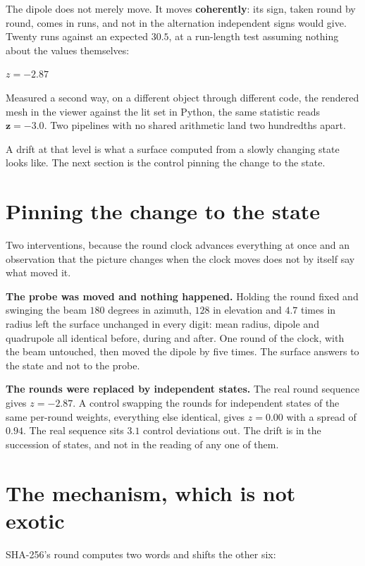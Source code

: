 The dipole does not merely move. It moves \textbf{coherently}: its sign, taken round by round, comes in runs, and not in the alternation independent signs would give. Twenty runs against an expected \(30.5\), at a run-length test assuming nothing about the values themselves:

\begin{center}
\(z = -2.87\)
\end{center}

Measured a second way, on a different object through different code, the rendered mesh in the viewer against the lit set in Python, the same statistic reads \(\mathbf{z = -3.0}\). Two pipelines with no shared arithmetic land two hundredths apart.

A drift at that level is what a surface computed from a slowly changing state looks like. The next section is the control pinning the change to the state.

\section{Pinning the change to the state}

Two interventions, because the round clock advances everything at once and an observation that the picture changes when the clock moves does not by itself say what moved it.

\textbf{The probe was moved and nothing happened.} Holding the round fixed and swinging the beam \(180\) degrees in azimuth, \(128\) in elevation and \(4.7\) times in radius left the surface unchanged in every digit: mean radius, dipole and quadrupole all identical before, during and after. One round of the clock, with the beam untouched, then moved the dipole by five times. The surface answers to the state and not to the probe.

\textbf{The rounds were replaced by independent states.} The real round sequence gives \(z = -2.87\). A control swapping the rounds for independent states of the same per-round weights, everything else identical, gives \(z = 0.00\) with a spread of \(0.94\). The real sequence sits \(3.1\) control deviations out. The drift is in the succession of states, and not in the reading of any one of them.

\section{The mechanism, which is not exotic}

SHA-256's round computes two words and shifts the other six:

